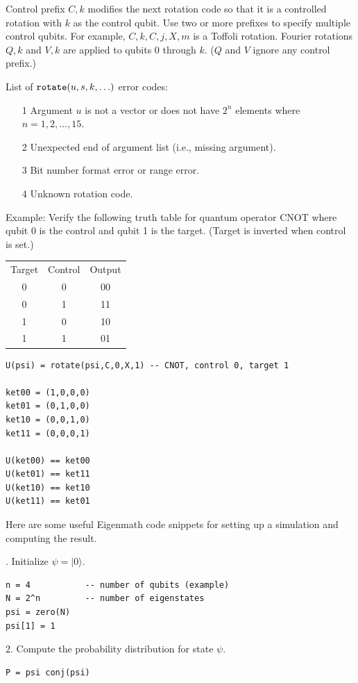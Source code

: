\documentclass[12pt]{article}
\begin{document}
Control prefix $C,k$ modifies the next rotation code so that it
is a controlled rotation with $k$ as the control qubit.
Use two or more prefixes to specify multiple control qubits.
For example, $C,k,C,j,X,m$ is a Toffoli rotation.
Fourier rotations $Q,k$ and $V,k$ are applied to qubits 0 through $k$.
($Q$ and $V$ ignore any control prefix.)

\bigskip
List of $\text{\tt rotate}(u,s,k,\ldots)$ error codes:
\begin{itemize}
\item[1] Argument $u$ is not a vector or does not have $2^n$ elements where $n=1,2,\ldots,15$.
\item[2] Unexpected end of argument list (i.e., missing argument).
\item[3] Bit number format error or range error.
\item[4] Unknown rotation code.
\end{itemize}

Example:
Verify the following truth table for quantum operator CNOT
where qubit 0 is the control and qubit 1 is the target.
(Target is inverted when control is set.)
\begin{center}
\begin{tabular}{ccc}
Target & Control & Output \\
0 & 0 & 00 \\
0 & 1 & 11 \\
1 & 0 & 10 \\
1 & 1 & 01
\end{tabular}
\end{center}

{\color{blue}
\begin{verbatim}
U(psi) = rotate(psi,C,0,X,1) -- CNOT, control 0, target 1

ket00 = (1,0,0,0)
ket01 = (0,1,0,0)
ket10 = (0,0,1,0)
ket11 = (0,0,0,1)

U(ket00) == ket00
U(ket01) == ket11
U(ket10) == ket10
U(ket11) == ket01
\end{verbatim}
}

Here are some useful Eigenmath code snippets for setting up a simulation
and computing the result.

. Initialize $\psi=|0\rangle$.
{\color{blue}
\begin{verbatim}
n = 4           -- number of qubits (example)
N = 2^n         -- number of eigenstates
psi = zero(N)
psi[1] = 1
\end{verbatim}
}

2. Compute the probability distribution for state $\psi$.
{\color{blue}
\begin{verbatim}
P = psi conj(psi)
\end{verbatim}
}
\end{document}
